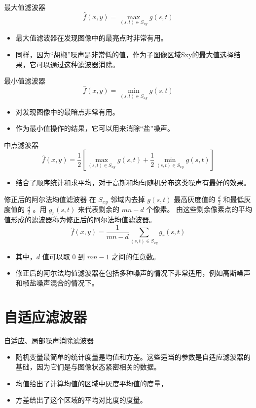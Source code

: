 \documentclass[presentation]{beamer}
\begin{document}
\begin{frame}[label={sec:orgd3c5166}]{最大值滤波器}
\[  \hat f(x,y) = \max_{(s,t)\in S_{xy}}g(s,t) \]
\begin{itemize}
\item 最大值滤波器在发现图像中的最亮点时非常有用。
\item 同样，因为“胡椒”噪声是非常低的值，作为子图像区域Sxy的最大值选择结果，它可以通过这种滤波器消除。
\end{itemize}
\end{frame}

\begin{frame}[label={sec:org4fe39ea}]{最小值滤波器}
\[  \hat f(x,y) = \min_{(s,t)\in S_{xy}}g(s,t) \]
\begin{itemize}
\item 对发现图像中的最暗点非常有用。
\item 作为最小值操作的结果，它可以用来消除“盐”噪声。
\end{itemize}
\end{frame}

\begin{frame}[label={sec:orgc43d7cd}]{中点滤波器}
\[  \hat f(x,y) = \frac{1}{2}\left[\max_{(s,t)\in S_{xy}}g(s,t)+\frac{1}{2}\min_{(s,t)\in S_{xy}}g(s,t)\right] \]
\begin{itemize}
\item 结合了顺序统计和求平均，对于高斯和均匀随机分布这类噪声有最好的效果。
\end{itemize}
\end{frame}

\begin{frame}[label={sec:org64b0c64}]{修正后的阿尔法均值滤波器}
在 \(S_{xy}\) 邻域内去掉 \(g(s,t)\) 最高灰度值的 \(\frac{d}{2}\) 和最低灰度值的 \(\frac{d}{2}\) 。用 \(g_r(s,t)\) 来代表剩余的 \(mn-d\) 个像素。
由这些剩余像素点的平均值形成的滤波器称为修正后的阿尔法均值滤波器。
\[ \hat f(x,y) = \frac{1}{mn-d}\sum_{(s,t)\in S_{xy}}g_r(s,t) \]
\begin{itemize}
\item 其中，\(d\) 值可以取 \(0\) 到 \(mn-1\) 之间的任意数。
\item 修正后的阿尔法均值滤波器在包括多种噪声的情况下非常适用，例如高斯噪声和椒盐噪声混合的情况下。
\end{itemize}
\end{frame}

\section{自适应滤波器}
\label{sec:orgeaa3050}
\begin{frame}[label={sec:orgc6dc8cc}]{自适应、局部噪声消除滤波器}
\begin{itemize}
\item 随机变量最简单的统计度量是均值和方差。这些适当的参数是自适应滤波器的基础，因为它们是与图像状态紧密相关的数据。
\item 均值给出了计算均值的区域中灰度平均值的度量，
\item 方差给出了这个区域的平均对比度的度量。
\end{itemize}
\end{frame}
\end{document}
